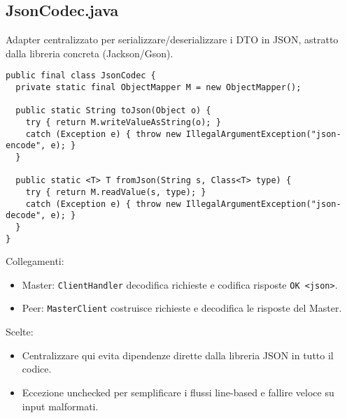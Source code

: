 \documentclass[a4paper,12pt]{article}
\begin{document}
\subsection*{JsonCodec.java}
Adapter centralizzato per serializzare/deserializzare i DTO in JSON, astratto dalla libreria concreta (Jackson/Gson).
\begin{lstlisting}
public final class JsonCodec {
  private static final ObjectMapper M = new ObjectMapper();

  public static String toJson(Object o) {
    try { return M.writeValueAsString(o); }
    catch (Exception e) { throw new IllegalArgumentException("json-encode", e); }
  }

  public static <T> T fromJson(String s, Class<T> type) {
    try { return M.readValue(s, type); }
    catch (Exception e) { throw new IllegalArgumentException("json-decode", e); }
  }
}
\end{lstlisting}
Collegamenti:
\begin{itemize}[nosep]
  \item Master: \texttt{ClientHandler} decodifica richieste e codifica risposte \texttt{OK <json>}.
  \item Peer: \texttt{MasterClient} costruisce richieste e decodifica le risposte del Master.
\end{itemize}
Scelte:
\begin{itemize}[nosep]
  \item Centralizzare qui evita dipendenze dirette dalla libreria JSON in tutto il codice.
  \item Eccezione unchecked per semplificare i flussi line-based e fallire veloce su input malformati.
\end{itemize}
\end{document}
